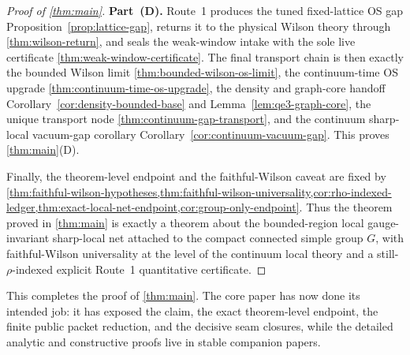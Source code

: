 \begin{proof}[Proof of \cref{thm:main}]
\textbf{Part~(D).} Route~1 produces the tuned fixed-lattice OS gap Proposition~\ref{prop:lattice-gap}, returns it to the physical Wilson theory through \cref{thm:wilson-return}, and seals the weak-window intake with the sole live certificate \cref{thm:weak-window-certificate}. The final transport chain is then exactly the bounded Wilson limit \cref{thm:bounded-wilson-os-limit}, the continuum-time OS upgrade \cref{thm:continuum-time-os-upgrade}, the density and graph-core handoff Corollary~\ref{cor:density-bounded-base} and Lemma~\ref{lem:qe3-graph-core}, the unique transport node \cref{thm:continuum-gap-transport}, and the continuum sharp-local vacuum-gap corollary Corollary~\ref{cor:continuum-vacuum-gap}. This proves \cref{thm:main}(D).

Finally, the theorem-level endpoint and the faithful-Wilson caveat are fixed by \cref{thm:faithful-wilson-hypotheses,thm:faithful-wilson-universality,cor:rho-indexed-ledger,thm:exact-local-net-endpoint,cor:group-only-endpoint}. Thus the theorem proved in \cref{thm:main} is exactly a theorem about the bounded-region local gauge-invariant sharp-local net attached to the compact connected simple group $G$, with faithful-Wilson universality at the level of the continuum local theory and a still-$\rho$-indexed explicit Route~1 quantitative certificate.
\end{proof}

This completes the proof of \cref{thm:main}. The core paper has now done its intended job: it has exposed the claim, the exact theorem-level endpoint, the finite public packet reduction, and the decisive seam closures, while the detailed analytic and constructive proofs live in stable companion papers.
